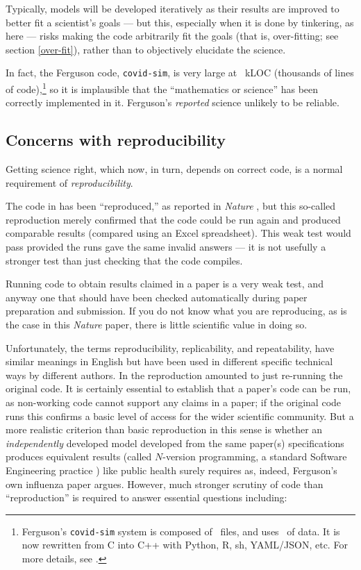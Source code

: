 \documentclass{comjnl}
\begin{document}
\label{discuss-covid-sim}
Typically, models will be developed iteratively as their results are improved to better fit a scientist's goals --- but this, especially when it is done by tinkering, as here --- risks making the code arbitrarily fit the goals (that is, over-fitting; see section \ref{over-fit}), rather than to objectively elucidate the science. 

In fact, the Ferguson code, \texttt{covid-sim}, is very large at \covidsimkLOC\ kLOC (thousands of lines of code),\footnote{Ferguson's \texttt{covid-sim} system is composed of \covidsimfiles\ files, and uses \covidsimdata\ of data. It is now rewritten from C into C++ with Python, R, sh, YAML/JSON, etc. For more details, see \supplement.} so it is implausible that the ``mathematics or science'' has been correctly implemented in it. Ferguson's \emph{reported\/} science unlikely to be reliable. 

\subsection{Concerns with reproducibility}
\label{reproducibility-concerns}
Getting science right, which now, in turn, depends on correct code, is a normal requirement of \emph{reproducibility}.

The code in \cite{nature-summary,ICmodel} has been ``reproduced,'' as reported in \emph{Nature\/} \cite{codecheck,thumbs-up}, but this so-called reproduction merely confirmed that the code could be run again and produced comparable results (compared using an Excel spreadsheet). This weak test would pass provided the runs gave the same invalid answers --- it is not usefully a stronger test than just checking that the code compiles.

Running code to obtain results claimed in a paper is a very weak test, and anyway one that should have been checked automatically during paper preparation and submission. If you do not know what you are reproducing, as is the case in this \emph{Nature\/} paper, there is little scientific value in doing so.

Unfortunately, the terms reproducibility, replicability, and repeatability, have similar meanings in English but have been used in different specific technical ways by different authors. In \cite{codecheck,thumbs-up} the reproduction amounted to just re-running the original code. It is certainly essential to establish that a paper's code can be run, as non-working code cannot support any claims in a paper; if the original code runs this confirms a basic level of access for the wider scientific community. But a more realistic criterion than basic reproduction in this sense is whether an \emph{independently\/} developed model developed from the same paper(s) specifications produces equivalent results (called $N$-version programming, a standard Software Engineering practice \cite{NVP}) like public health surely requires as, indeed, Ferguson's own influenza paper \cite{nvp-ferguson} argues. However, much stronger scrutiny of code than ``reproduction'' is required to answer essential questions including:
\end{document}
